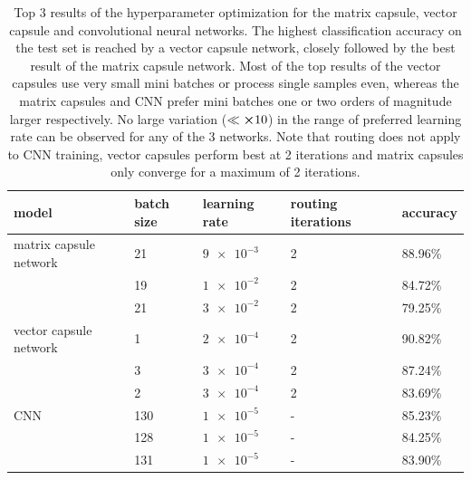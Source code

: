 \begin{table}[H]
\centering
\begin{tabular}{lllll}
\hline
model                  & batch size & learning rate & routing iterations & accuracy \\ \hline
matrix capsule network & 21         & $\num{9e-3}$  & 2                  & 88.96\%  \\
                       & 19         & $\num{1e-2}$  & 2                  & 84.72\%  \\
                       & 21         & $\num{3e-2}$  & 2                  & 79.25\%  \\
vector capsule network & 1          & $\num{2e-4}$  & 2                  & 90.82\%  \\
                       & 3          & $\num{3e-4}$  & 2                  & 87.24\%  \\

                       & 2          & $\num{3e-4}$  & 2                  & 83.69\%  \\
CNN                    & 130        & $\num{1e-5}$  & -                  & 85.23\%  \\
                       & 128        & $\num{1e-5}$  & -                  & 84.25\%  \\
                       & 131        & $\num{1e-5}$  & -                  & 83.90\%  \\ \hline
\end{tabular}
\caption[Top 3 results of the hyperparameter optimization for the matrix capsule, vector capsule and convolutional neural networks]{Top 3 results of the hyperparameter optimization for the matrix capsule, vector capsule and convolutional neural networks. The highest classification accuracy on the test set is reached by a vector capsule network, closely followed by the best result of the matrix capsule network. Most of the top results of the vector capsules use very small mini batches or process single samples even, whereas the matrix capsules and CNN prefer mini batches one or two orders of magnitude larger respectively. No large variation ($\ll\cross 10$) in the range of preferred learning rate can be observed for any of the 3 networks. Note that routing does not apply to CNN training, vector capsules perform best at 2 iterations and matrix capsules only converge for a maximum of 2 iterations.}
\label{tab:pytorch-best}
\end{table}
